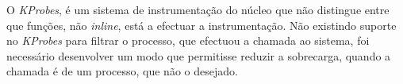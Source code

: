 




O \textit{KProbes}, é um sistema de instrumentação do núcleo que não distingue entre que funções, não \textit{inline}, está a efectuar a instrumentação.
Não existindo suporte no \textit{KProbes} para filtrar o processo, que efectuou a chamada ao sistema, foi necessário desenvolver um modo que permitisse reduzir a sobrecarga, quando a chamada é de um processo, que não o desejado.




